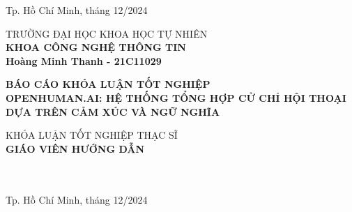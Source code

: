 \begin{titlepage}
\begin{center}
\vfill
Tp. Hồ Chí Minh, tháng 12/2024

\end{center}

\pagebreak



\begin{center}

TRƯỜNG ĐẠI HỌC KHOA HỌC TỰ NHIÊN\\
\textbf{KHOA CÔNG NGHỆ THÔNG TIN}\\[2cm]


{\large \bfseries Hoàng Minh Thanh - 21C11029\\[2cm]}


{ \Large \bfseries  BÁO CÁO KHÓA LUẬN TỐT NGHIỆP \\OPENHUMAN.AI: HỆ THỐNG TỔNG HỢP CỬ CHỈ HỘI THOẠI DỰA TRÊN CẢM XÚC VÀ NGỮ NGHĨA\\[2cm] } 


\large KHÓA LUẬN TỐT NGHIỆP THẠC SĨ \\


\textbf{GIÁO VIÊN HƯỚNG DẪN}\\
\tenGVHD\\
\tenBM\\


\vfill
Tp. Hồ Chí Minh, tháng 12/2024

\end{center}

\end{titlepage}